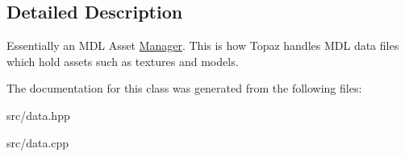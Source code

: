 \subsection{Detailed Description}
Essentially an M\+DL Asset \mbox{\hyperlink{classtz_1_1data_1_1_manager}{Manager}}. This is how Topaz handles M\+DL data files which hold assets such as textures and models. 

The documentation for this class was generated from the following files\+:\begin{DoxyCompactItemize}
\item 
src/data.\+hpp\item 
src/data.\+cpp\end{DoxyCompactItemize}
